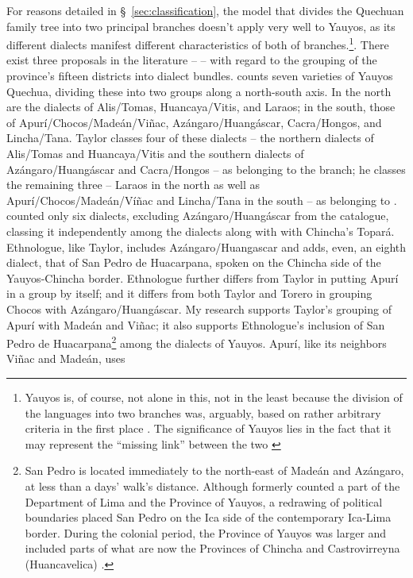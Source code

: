 For reasons detailed in \S~\ref{sec:classification}, the model that divides the Quechuan family tree into two principal branches doesn't apply very well to Yauyos, as its different dialects manifest different characteristics of both of branches.\footnote{Yauyos is, of course, not alone in this, not in the least because the division of the languages into two branches was, arguably, based on rather arbitrary criteria in the first place \citep[See in particular][]{Landerman91}. The significance of Yauyos lies in the fact that it may represent the ``missing link'' between the two \citep[See in particular][]{Heggarty07}}. There exist three proposals in the literature  -- \citet{Taylor00,Torero74,ethnologue} -- with regard to the grouping of the province's fifteen districts into dialect bundles. \citet[105]{Taylor00} counts seven varieties of Yauyos Quechua, dividing these into two groups along a north-south axis. In the north are the dialects of Alis/Tomas, Huancaya/Vitis, and Laraos; in the south, those of Apur\'i/Chocos/Made\'an/Vi\~nac, Az\'angaro/Huang\'ascar, Cacra/Hongos, and Lincha/Tana. Taylor classes four of these dialects -- the northern dialects of Alis/Tomas and Huancaya/Vitis and the southern dialects of Az\'angaro/Huang\'ascar and Cacra/Hongos -- as belonging to the \QI{} branch; he classes the remaining three -- Laraos in the north as well as Apur\'i/Cho\-cos/Made\'an/V\'i\~nac and Lincha/Tana in the south -- as belonging to \QII{}. \citet{Torero74} counted only six dialects, excluding Az\'angaro/Huang\'ascar from the catalogue, classing it independently among the \QI{} dialects along with with Chincha's Topar\'a.  Ethnologue, like Taylor, includes Az\'angaro/Huangascar and adds, even, an eighth dialect, that of San Pedro de Huacarpana, spoken on the Chincha side of the Yauyos-Chincha border. Ethnologue further differs from Taylor in putting Apur\'i in a group by itself; and it differs from both Taylor and Torero in grouping Chocos with Az\'angaro/Huang\'ascar. My research supports Taylor's grouping of Apur\'i with Made\'an and Vi\~nac; it also supports Ethnologue's inclusion of San Pedro de Huacarpana\footnote{San Pedro is located immediately to the north-east of Made\'an and Az\'angaro, at less than a days' walk's distance. Although formerly counted a part of the Department of Lima and the Province of Yauyos, a redrawing of political boundaries placed San Pedro on the Ica side of the contemporary Ica-Lima border. During the colonial period, the Province of Yauyos was larger and included parts of what are now the Provinces of Chincha and Castrovirreyna (Huancavelica) \citet[1.1.3.2.7]{Landerman91}.} among the dialects of Yauyos. Apur\'i, like its neighbors Vi\~nac and Made\'an, uses 